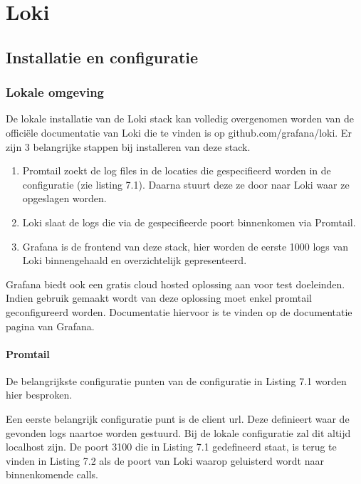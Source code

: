 
\chapter{Loki}
\label{ch:loki}

\section{Installatie en configuratie}

\subsection{Lokale omgeving}
De lokale installatie van de Loki stack kan volledig overgenomen worden van de officiële documentatie van Loki die te vinden is op github.com/grafana/loki. Er zijn 3 belangrijke stappen bij installeren van deze stack. 
\begin{enumerate}
    \item Promtail zoekt de log files in de locaties die gespecifieerd worden in de configuratie (zie listing 7.1). Daarna stuurt deze ze door naar Loki waar ze opgeslagen worden.
    \item Loki slaat de logs die via de gespecifieerde poort binnenkomen via Promtail.
    \item Grafana is de frontend van deze stack, hier worden de eerste 1000 logs van Loki binnengehaald en overzichtelijk gepresenteerd.
\end{enumerate}

Grafana biedt ook een gratis cloud hosted oplossing aan voor test doeleinden. Indien gebruik gemaakt wordt van deze oplossing moet enkel promtail geconfigureerd worden. Documentatie hiervoor is te vinden op de documentatie pagina van Grafana.

\subsubsection{Promtail}
De belangrijkste configuratie punten van de configuratie in Listing 7.1 worden hier besproken.

Een eerste belangrijk configuratie punt is de client url. Deze definieert waar de gevonden logs naartoe worden gestuurd. Bij de lokale configuratie zal dit altijd localhost zijn. De poort 3100 die in Listing 7.1 gedefineerd staat, is terug te vinden in Listing 7.2 als de poort van Loki waarop geluisterd wordt naar binnenkomende calls.

